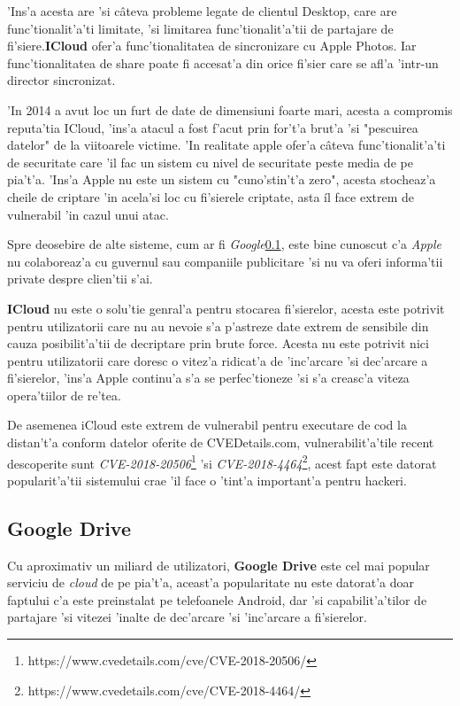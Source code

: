 \documentclass[12pt,a4paper,twoside]{report}
\begin{document}
'Ins'a acesta are 'si câteva probleme  legate de clientul Desktop, care are func'tionalit'a'ti limitate, 'si limitarea func'tionalit'a'tii de partajare de fi'siere.\textbf{ICloud} ofer'a func'tionalitatea de sincronizare cu Apple Photos. Iar func'tionalitatea de share poate fi accesat'a din orice fi'sier care se afl'a 'intr-un director sincronizat.

'In 2014 a avut loc un furt de date de dimensiuni foarte mari, acesta a compromis reputa'tia ICloud, 'ins'a atacul a fost f'acut prin for't'a brut'a 'si "pescuirea datelor" de la viitoarele victime. 'In realitate apple ofer'a câteva func'tionalit'a'ti de securitate care 'il fac un sistem cu nivel de securitate peste media de pe pia't'a. 'Ins'a  Apple nu este un sistem cu "cuno'stin't'a zero", acesta stocheaz'a cheile de criptare 'in acela'si loc cu fi'sierele criptate, asta íl face extrem de vulnerabil 'in cazul unui atac.

Spre deosebire de alte sisteme, cum ar fi \textit{Google}\ref{google_drive}, este bine cunoscut c'a \textit{Apple} nu colaboreaz'a cu guvernul sau companiile publicitare 'si nu va oferi informa'tii private despre clien'tii s'ai.

\textbf{ICloud} nu este o solu'tie genral'a pentru stocarea fi'sierelor, acesta este potrivit pentru utilizatorii care nu au nevoie s'a p'astreze date extrem de sensibile din cauza posibilit'a'tii de decriptare prin brute force. Acesta nu este potrivit nici pentru utilizatorii care doresc o vitez'a ridicat'a de 'inc'arcare 'si dec'arcare a fi'sierelor, 'ins'a Apple continu'a s'a se perfec'tioneze 'si s'a creasc'a viteza opera'tiilor de re'tea.

De asemenea iCloud este extrem de vulnerabil pentru executare de cod la distan't'a conform datelor oferite de CVEDetails.com, vulnerabilit'a'tile recent descoperite sunt  {\it CVE-2018-20506}\footnote{https://www.cvedetails.com/cve/CVE-2018-20506/} 'si  {\it CVE-2018-4464}\footnote{https://www.cvedetails.com/cve/CVE-2018-4464/}, acest fapt este datorat popularit'a'tii sistemului crae 'il face o 'tint'a important'a pentru hackeri.



\subsection{Google Drive}\label{google_drive}
Cu aproximativ un miliard de utilizatori, \textbf{Google Drive} este cel mai popular serviciu de \textit{cloud} de pe pia't'a, aceast'a popularitate nu este datorat'a doar faptului c'a este preinstalat pe telefoanele Android, dar 'si capabilit'a'tilor de partajare 'si vitezei 'inalte de dec'arcare 'si 'inc'arcare a fi'sierelor. 
\end{document}
